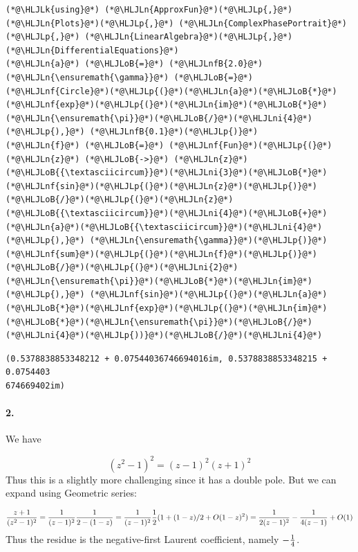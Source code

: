\documentclass[12pt,a4paper]{article}
\newcommand{\HLJLk}[1]{\textcolor[RGB]{148,91,176}{\textbf{#1}}}
\newcommand{\HLJLn}[1]{#1}
\newcommand{\HLJLnf}[1]{\textcolor[RGB]{66,102,213}{#1}}
\newcommand{\HLJLnfB}[1]{\textcolor[RGB]{59,151,46}{#1}}
\newcommand{\HLJLni}[1]{\textcolor[RGB]{59,151,46}{#1}}
\newcommand{\HLJLoB}[1]{\textcolor[RGB]{102,102,102}{\textbf{#1}}}
\newcommand{\HLJLp}[1]{#1}
\begin{document}
\begin{lstlisting}
(*@\HLJLk{using}@*) (*@\HLJLn{ApproxFun}@*)(*@\HLJLp{,}@*) (*@\HLJLn{Plots}@*)(*@\HLJLp{,}@*) (*@\HLJLn{ComplexPhasePortrait}@*)(*@\HLJLp{,}@*) (*@\HLJLn{LinearAlgebra}@*)(*@\HLJLp{,}@*) (*@\HLJLn{DifferentialEquations}@*)
(*@\HLJLn{a}@*) (*@\HLJLoB{=}@*) (*@\HLJLnfB{2.0}@*)
(*@\HLJLn{\ensuremath{\gamma}}@*) (*@\HLJLoB{=}@*) (*@\HLJLnf{Circle}@*)(*@\HLJLp{(}@*)(*@\HLJLn{a}@*)(*@\HLJLoB{*}@*)(*@\HLJLnf{exp}@*)(*@\HLJLp{(}@*)(*@\HLJLn{im}@*)(*@\HLJLoB{*}@*)(*@\HLJLn{\ensuremath{\pi}}@*)(*@\HLJLoB{/}@*)(*@\HLJLni{4}@*)(*@\HLJLp{),}@*) (*@\HLJLnfB{0.1}@*)(*@\HLJLp{)}@*)
(*@\HLJLn{f}@*) (*@\HLJLoB{=}@*) (*@\HLJLnf{Fun}@*)(*@\HLJLp{(}@*)(*@\HLJLn{z}@*) (*@\HLJLoB{->}@*) (*@\HLJLn{z}@*)(*@\HLJLoB{{\textasciicircum}}@*)(*@\HLJLni{3}@*)(*@\HLJLoB{*}@*)(*@\HLJLnf{sin}@*)(*@\HLJLp{(}@*)(*@\HLJLn{z}@*)(*@\HLJLp{)}@*)(*@\HLJLoB{/}@*)(*@\HLJLp{(}@*)(*@\HLJLn{z}@*)(*@\HLJLoB{{\textasciicircum}}@*)(*@\HLJLni{4}@*)(*@\HLJLoB{+}@*)(*@\HLJLn{a}@*)(*@\HLJLoB{{\textasciicircum}}@*)(*@\HLJLni{4}@*)(*@\HLJLp{),}@*) (*@\HLJLn{\ensuremath{\gamma}}@*)(*@\HLJLp{)}@*)
(*@\HLJLnf{sum}@*)(*@\HLJLp{(}@*)(*@\HLJLn{f}@*)(*@\HLJLp{)}@*)(*@\HLJLoB{/}@*)(*@\HLJLp{(}@*)(*@\HLJLni{2}@*)(*@\HLJLn{\ensuremath{\pi}}@*)(*@\HLJLoB{*}@*)(*@\HLJLn{im}@*)(*@\HLJLp{),}@*) (*@\HLJLnf{sin}@*)(*@\HLJLp{(}@*)(*@\HLJLn{a}@*)(*@\HLJLoB{*}@*)(*@\HLJLnf{exp}@*)(*@\HLJLp{(}@*)(*@\HLJLn{im}@*)(*@\HLJLoB{*}@*)(*@\HLJLn{\ensuremath{\pi}}@*)(*@\HLJLoB{/}@*)(*@\HLJLni{4}@*)(*@\HLJLp{))}@*)(*@\HLJLoB{/}@*)(*@\HLJLni{4}@*)
\end{lstlisting}

\begin{lstlisting}
(0.5378838853348212 + 0.07544036746694016im, 0.5378838853348215 + 0.0754403
674669402im)
\end{lstlisting}


\paragraph{2.}
We have 

\[
(z^2-1)^2 = (z-1)^2(z+1)^2
\]
Thus this is a slightly more challenging since it has a double pole. But we can expand using Geometric series:

\[
    {z+1 \over (z^2-1)^2} = {1 \over (z-1)^2} {1 \over 2 - (1-z)} = {1 \over (z-1)^2} {1 \over 2} (1 + (1-z)/2 +O(1-z)^2) = {1 \over 2(z-1)^2} - {1 \over 4 (z-1)}  + O(1)
\]
Thus the residue is the negative-first Laurent coefficient, namely $-{1 \over 4}$.
\end{document}
